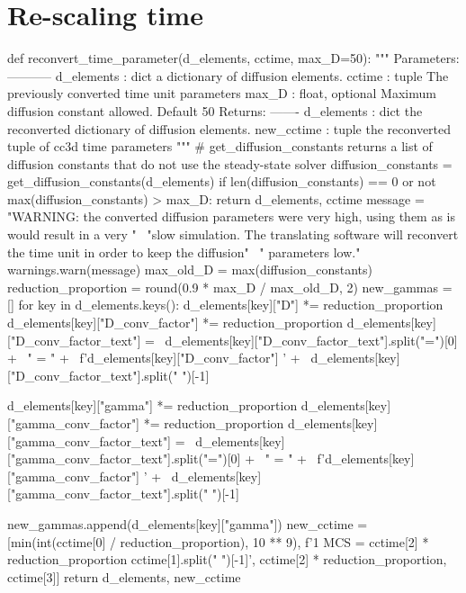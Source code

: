 \section{Re-scaling time}\label{code:trans:recon-time}

\begin{python}
def reconvert_time_parameter(d_elements, cctime, max_D=50):
    """
    Parameters:
    -----------
    d_elements : dict
        a dictionary of diffusion elements.
    cctime : tuple
        The previously converted time unit parameters
    max_D : float, optional
        Maximum diffusion constant allowed. Default 50
    Returns:
    -------
        d_elements : dict
            the reconverted dictionary of diffusion elements.
        new_cctime : tuple
            the reconverted tuple of cc3d time parameters
    """
    # get_diffusion_constants returns a list of diffusion constants that do not use the steady-state solver
    diffusion_constants = get_diffusion_constants(d_elements)
    if len(diffusion_constants) == 0 or not max(diffusion_constants) > max_D:
        return d_elements, cctime
    message = "WARNING: the converted diffusion parameters were very high, using them as is would result in a very " \
              "slow simulation. The translating software will reconvert the time unit in order to keep the diffusion" \
              " parameters low."
    warnings.warn(message)
    max_old_D = max(diffusion_constants)
    reduction_proportion = round(0.9 * max_D / max_old_D, 2)
    new_gammas = []
    for key in d_elements.keys():
        d_elements[key]["D"] *= reduction_proportion
        d_elements[key]["D_conv_factor"] *= reduction_proportion
        d_elements[key]["D_conv_factor_text"] = \ 
            d_elements[key]["D_conv_factor_text"].split("=")[0] + \ 
            " = " + \
            f'{d_elements[key]["D_conv_factor"]} ' + \
            d_elements[key]["D_conv_factor_text"].split(" ")[-1]

        d_elements[key]["gamma"] *= reduction_proportion
        d_elements[key]["gamma_conv_factor"] *= reduction_proportion
        d_elements[key]["gamma_conv_factor_text"] = \ 
            d_elements[key]["gamma_conv_factor_text"].split("=")[0] + \ 
            " = " + \
            f'{d_elements[key]["gamma_conv_factor"]} ' + \
            d_elements[key]["gamma_conv_factor_text"].split(" ")[-1]

        new_gammas.append(d_elements[key]["gamma"])
    new_cctime = [min(int(cctime[0] / reduction_proportion), 10 ** 9),
                  f'1 MCS = {cctime[2] * reduction_proportion} {cctime[1].split(" ")[-1]}',
                  cctime[2] * reduction_proportion,
                  cctime[3]]
    return d_elements, new_cctime
\end{python}

